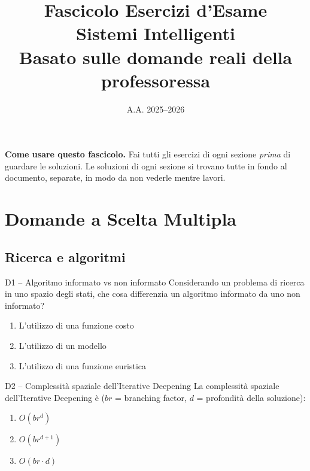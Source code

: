 \documentclass[12pt,a4paper]{article}
\title{\textbf{Fascicolo Esercizi d'Esame}\\[6pt]
{\large Sistemi Intelligenti}\\[4pt]
\normalsize Basato sulle domande reali della professoressa}
\author{}
\date{A.A. 2025--2026}
\begin{document}
\maketitle

\begin{tcolorbox}[colback=blue!5, colframe=blue!40!black]
\textbf{Come usare questo fascicolo.} Fai tutti gli esercizi di ogni sezione \emph{prima} di guardare le soluzioni. Le soluzioni di ogni sezione si trovano tutte in fondo al documento, separate, in modo da non vederle mentre lavori.
\end{tcolorbox}

\tableofcontents
\newpage


\section{Domande a Scelta Multipla}

\subsection{Ricerca e algoritmi}

\begin{domanda}{D1 -- Algoritmo informato vs non informato}
Considerando un problema di ricerca in uno spazio degli stati, che cosa differenzia un algoritmo informato da uno non informato?
\begin{enumerate}[label=\alph*.]
  \item L'utilizzo di una funzione costo
  \item L'utilizzo di un modello
  \item L'utilizzo di una funzione euristica
\end{enumerate}
\end{domanda}

\begin{domanda}{D2 -- Complessità spaziale dell'Iterative Deepening}
La complessità spaziale dell'Iterative Deepening è ($br$ = branching factor, $d$ = profondità della soluzione):
\begin{enumerate}[label=\alph*.]
  \item $O(br^d)$
  \item $O(br^{d+1})$
  \item $O(br \cdot d)$
\end{enumerate}
\end{domanda}
\end{document}

